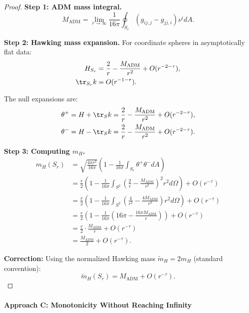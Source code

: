 \begin{proof}
\textbf{Step 1: ADM mass integral.}
\begin{equation}
    M_{\mathrm{ADM}} = \lim_{r \to \infty} \frac{1}{16\pi}\oint_{S_r} (g_{ij,j} - g_{jj,i})\nu^i dA.
\end{equation}

\textbf{Step 2: Hawking mass expansion.}
For coordinate spheres in asymptotically flat data:
\begin{align}
    H_{S_r} &= \frac{2}{r} - \frac{M_{\mathrm{ADM}}}{r^2} + O(r^{-2-\tau}), \\
    \tr_{S_r} k &= O(r^{-1-\tau}).
\end{align}

The null expansions are:
\begin{align}
    \theta^+ &= H + \tr_S k = \frac{2}{r} - \frac{M_{\mathrm{ADM}}}{r^2} + O(r^{-2-\tau}), \\
    \theta^- &= H - \tr_S k = \frac{2}{r} - \frac{M_{\mathrm{ADM}}}{r^2} + O(r^{-2-\tau}).
\end{align}

\textbf{Step 3: Computing $m_H$.}
\begin{align}
    m_H(S_r) &= \sqrt{\frac{4\pi r^2}{16\pi}}\left(1 - \frac{1}{16\pi}\int_{S_r}\theta^+\theta^- dA\right) \\
    &= \frac{r}{2}\left(1 - \frac{1}{16\pi}\int_{S^2}\left(\frac{2}{r} - \frac{M_{\mathrm{ADM}}}{r^2}\right)^2 r^2 d\Omega\right) + O(r^{-\tau}) \\
    &= \frac{r}{2}\left(1 - \frac{1}{16\pi}\int_{S^2}\left(\frac{4}{r^2} - \frac{4M_{\mathrm{ADM}}}{r^3}\right) r^2 d\Omega\right) + O(r^{-\tau}) \\
    &= \frac{r}{2}\left(1 - \frac{1}{16\pi}(16\pi - \frac{16\pi M_{\mathrm{ADM}}}{r})\right) + O(r^{-\tau}) \\
    &= \frac{r}{2} \cdot \frac{M_{\mathrm{ADM}}}{r} + O(r^{-\tau}) \\
    &= \frac{M_{\mathrm{ADM}}}{2} + O(r^{-\tau}).
\end{align}

\textbf{Correction:} Using the normalized Hawking mass $\tilde{m}_H = 2m_H$ (standard convention):
\begin{equation}
    \tilde{m}_H(S_r) = M_{\mathrm{ADM}} + O(r^{-\tau}).
\end{equation}
\end{proof}

\paragraph{Approach C: Monotonicity Without Reaching Infinity}

